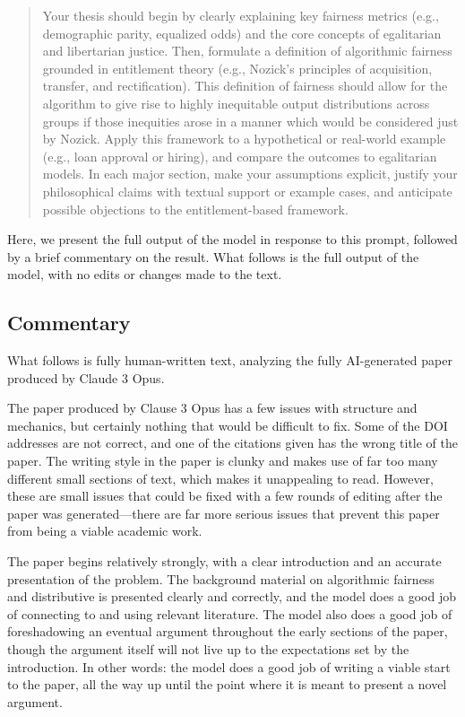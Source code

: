 \begin{quote}
    Your thesis should begin by clearly explaining key fairness metrics
    (e.g., demographic parity, equalized odds) and the core concepts of
    egalitarian and libertarian justice. Then, formulate a definition of
    algorithmic fairness grounded in entitlement theory (e.g., Nozick’s
    principles of acquisition, transfer, and rectification). This
    definition of fairness should allow for the algorithm to give rise
    to highly inequitable output distributions across groups if those
    inequities arose in a manner which would be considered just by
    Nozick. Apply this framework to a hypothetical or real-world example
    (e.g., loan approval or hiring), and compare the outcomes to
    egalitarian models. In each major section, make your assumptions
    explicit, justify your philosophical claims with textual support or
    example cases, and anticipate possible objections to the
    entitlement-based framework.
\end{quote}

Here, we present the full output of the model in response to this prompt,
followed by a brief commentary on the result. What follows is the full output of
the model, with no edits or changes made to the text.



\subsection{Commentary}

What follows is fully human-written text, analyzing the fully AI-generated paper
produced by Claude 3 Opus.

The paper produced by Clause 3 Opus has a few issues with structure and
mechanics, but certainly nothing that would be difficult to fix. Some of the DOI
addresses are not correct, and one of the citations given has the wrong title
of the paper. The writing style in the paper is clunky and makes use of far too
many different small sections of text, which makes it unappealing to read. 
However, these are small issues that could be fixed with a few rounds of editing
after the paper was generated—there are far more serious issues that prevent
this paper from being a viable academic work.

The paper begins relatively strongly, with a clear introduction and an accurate
presentation of the problem. The background material on algorithmic fairness and
distributive is presented clearly and correctly, and the model does a good job
of connecting to and using relevant literature. The model also does a good job
of foreshadowing an eventual argument throughout the early sections of the
paper, though the argument itself will not live up to the expectations set by
the introduction. In other words: the model does a good job of writing a viable
start to the paper, all the way up until the point where it is meant to present
a novel argument.

